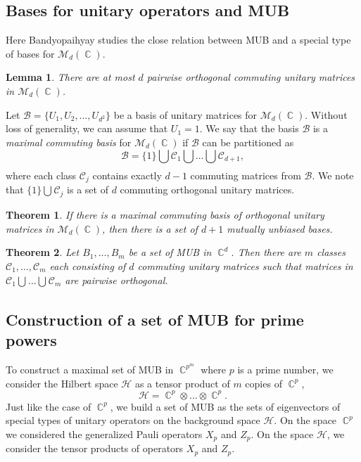 \documentclass[a4paper]{article}
\DeclareMathOperator{\C}{\mathbb{C}}
\newtheorem{theorem}{Theorem}
\newtheorem{lemma}{Lemma}
\begin{document}
  \subsection{Bases for unitary operators and MUB}

  Here Bandyopaihyay studies the close relation between MUB
  and a special type of bases for $\mathcal M_d(\C)$.

  \begin{lemma}
    There are at most $d$ pairwise orthogonal commuting
    unitary matrices in $\mathcal M_d(\C)$.
  \end{lemma}

  Let $\mathcal B = \{U_1,U_2,\ldots,U_{d^2}\}$ be a basis
  of unitary matrices for $\mathcal M_d(\C)$. Without loss
  of generality, we can assume that $U_1 = 1$. We say that
  the basis $\mathcal{B}$ is a \textit{maximal commuting
  basis} for $\mathcal{M}_d(\C)$ if $\mathcal{B}$ can be
  partitioned as
  \[
    \mathcal{B}
    = \{1\} \bigcup_{} \mathcal{C_1} \bigcup_{} \ldots
    \bigcup_{} \mathcal{C}_{d+1},
  \] 
  where each class $\mathcal{C}_j$ contains exactly $d-1$ 
  commuting matrices from $\mathcal{B}$. We note that $\{1\}
  \bigcup_{} \mathcal{C}_j$ is a set of $d$ commuting
  orthogonal unitary matrices.

  \begin{theorem}
    If there is a maximal commuting basis of orthogonal
    unitary matrices in $\mathcal{M}_d(\C)$, then there is a
    set of $d+1$ mutually unbiased bases.
  \end{theorem}

  \begin{theorem}
    Let $B_1,\ldots,B_m$ be a set of MUB in $\C^{d}$. Then
    there are $m$ classes
    $\mathcal{C}_1,\ldots,\mathcal{C}_m$ each consisting of
    $d$ commuting unitary matrices such that matrices in
    $\mathcal{C}_1 \bigcup_{} \ldots \bigcup_{}
    \mathcal{C}_m$ are pairwise orthogonal.
  \end{theorem}

  \subsection{Construction of a set of MUB for prime powers}

  To construct a maximal set of MUB in $\C^{p^{m}}$ where
  $p$ is a prime number, we consider the Hilbert space
  $\mathcal{H}$ as a tensor product of $m$ copies of
  $\C^{p}$,
  \[
    \mathcal{H} = \C^{p} \otimes \ldots \otimes \C^{p}.
  \] 
  Just like the case of $\C^{p}$, we build a set of MUB as
  the sets of eigenvectors of special types of unitary
  operators on the background space $\mathcal{H}$. On the
  space $\C^{p}$ we considered the generalized Pauli
  operators $X_p$ and $Z_p$. On the space $\mathcal{H}$, we
  consider the tensor products of operators $X_p$ and $Z_p$.
\end{document}
